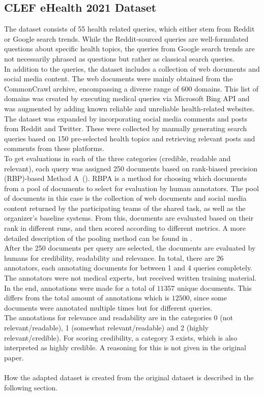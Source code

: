 \subsection{CLEF eHealth 2021 Dataset}
The dataset consists of 55 health related queries, which either stem from Reddit or Google search trends.
While the Reddit-sourced queries are well-formulated questions about specific health topics, the queries from Google search trends are not necessarily phrased as questions but rather as classical search queries.
\\
In addition to the queries, the dataset includes a collection of web documents and social media content.
The web documents were mainly obtained from the CommonCrawl archive, encompassing a diverse range of 600 domains.
This list of domains was created by executing medical queries via Microsoft Bing API and was augmented by adding known reliable and unreliable health-related websites.
The dataset was expanded by incorporating social media comments and posts from Reddit and Twitter.
These were collected by manually generating search queries based on 150 pre-selected health topics and retrieving relevant posts and comments from these platforms.
\\
To get evaluations in each of the three categories (credible, readable and relevant), each query was assigned 250 documents based on rank-biased precision (RBP)-based Method A~(\cite{moffat:2008}).
RBPA is a method for choosing which documents from a pool of documents to select for evaluation by human annotators.
The pool of documents in this case is the collection of web documents and social media content returned by the participating teams of the shared task, as well as the organizer's baseline systems.
From this, documents are evaluated based on their rank in different runs, and then scored according to different metrics.
A more detailed description of the pooling method can be found in \cite{lipani:2017}.
\\
After the 250 documents per query are selected, the documents are evaluated by humans for credibility, readability and relevance.
In total, there are 26 annotators, each annotating documents for between 1 and 4 queries completely.
The annotators were not medical experts, but received written training material.
In the end, annotations were made for  a total of $11 357$ unique documents.
This differs from the total amount of annotations which is $12 500$, since some documents were annotated multiple times but for different queries.
\\
The annotations for relevance and readability are in the categories 0 (not relevant/readable), 1 (somewhat relevant/readable) and 2 (highly relevant/credible).
For scoring credibility, a category 3 exists, which is also interpreted as highly credible.
A reasoning for this is not given in the original paper.
\\\\
How the adapted dataset is created from the original dataset is described in the following section.
